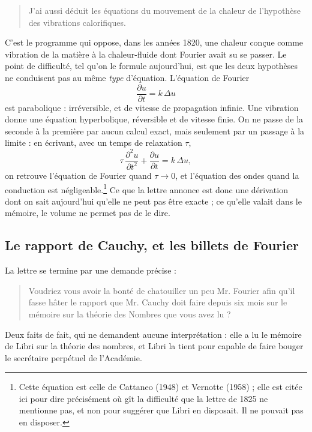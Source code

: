 \documentclass[11pt,a4paper]{article}
\begin{document}
\begin{quote}
J'ai aussi déduit les équations du mouvement de la chaleur de l'hypothèse des
vibrations calorifiques.
\end{quote}
C'est le programme qui oppose, dans les années 1820, une chaleur conçue comme
vibration de la matière à la chaleur-fluide dont Fourier avait su se passer.
Le point de difficulté, tel qu'on le formule aujourd'hui, est que les deux
hypothèses ne conduisent pas au même \emph{type} d'équation. L'équation de
Fourier
\[
\frac{\partial u}{\partial t} = k\,\Delta u
\]
est parabolique : irréversible, et de vitesse de propagation infinie. Une
vibration donne une équation hyperbolique, réversible et de vitesse finie. On
ne passe de la seconde à la première par aucun calcul exact, mais seulement par
un passage à la limite : en écrivant, avec un temps de relaxation $\tau$,
\[
\tau\,\frac{\partial^2 u}{\partial t^2} + \frac{\partial u}{\partial t}
= k\,\Delta u ,
\]
on retrouve l'équation de Fourier quand $\tau \to 0$, et l'équation des ondes
quand la conduction est négligeable.\footnote{Cette équation est celle de
Cattaneo (1948) et Vernotte (1958) ; elle est citée ici pour dire précisément
où gît la difficulté que la lettre de 1825 ne mentionne pas, et non pour
suggérer que Libri en disposait. Il ne pouvait pas en disposer.} Ce que la
lettre annonce est donc une dérivation dont on sait aujourd'hui qu'elle ne peut
pas être exacte ; ce qu'elle valait dans le mémoire, le volume ne permet pas
de le dire.

\subsection*{Le rapport de Cauchy, et les billets de Fourier}

La lettre se termine par une demande précise :
\begin{quote}
Voudriez vous avoir la bonté de chatouiller un peu Mr. Fourier afin qu'il fasse
hâter le rapport que Mr. Cauchy doit faire depuis six mois sur le mémoire sur
la théorie des Nombres que vous avez lu ?
\end{quote}
Deux faits de fait, qui ne demandent aucune interprétation : elle a lu le
mémoire de Libri sur la théorie des nombres, et Libri la tient pour capable de
faire bouger le secrétaire perpétuel de l'Académie.
\end{document}
